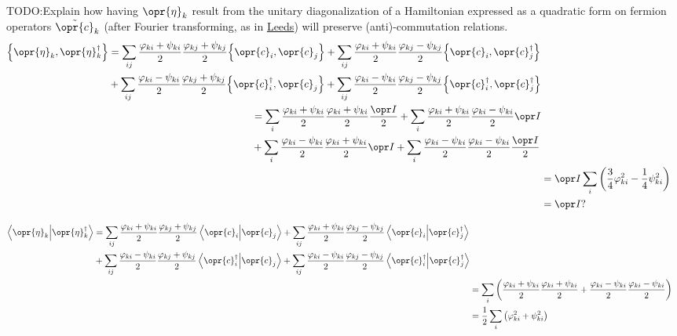 \documentclass[../thesis.tex]{subfiles}
\begin{document}
TODO:\@ Explain how having $\opr{\eta}_k$ result from the unitary
diagonalization of a Hamiltonian expressed as a quadratic form on fermion
operators $\tilde{\opr{c}}_k$ (after Fourier transforming, as in
\href{https://theory.leeds.ac.uk/interaction-distance/applications/ising/map-to-free/}{Leeds})
will preserve (anti)-commutation relations.
\begin{align}
  \begin{split}
    \acomm{\opr{\eta}_k}{\opr{\eta}_k^\dag}
  &=
  \sum_{ij}
  \frac{\varphi_{ki} + \psi_{ki}}{2}
  \frac{\varphi_{kj} + \psi_{kj}}{2}
  \acomm{\opr{c}_i}{\opr{c}_j}
  +
  \sum_{ij}
  \frac{\varphi_{ki} + \psi_{ki}}{2}
  \frac{\varphi_{kj} - \psi_{kj}}{2}
  \acomm{\opr{c}_i}{\opr{c}_j^\dag} \\
  &+
  \sum_{ij}
  \frac{\varphi_{ki} - \psi_{ki}}{2}
  \frac{\varphi_{kj} + \psi_{kj}}{2}
  \acomm{\opr{c}_i^\dag}{\opr{c}_j}
  +
  \sum_{ij}
  \frac{\varphi_{ki} - \psi_{ki}}{2}
  \frac{\varphi_{kj} - \psi_{kj}}{2}
  \acomm{\opr{c}_i^\dag}{\opr{c}_j^\dag}
  \end{split} \\
  \begin{split}
  &=
  \sum_{i}
  \frac{\varphi_{ki} + \psi_{ki}}{2}
  \frac{\varphi_{ki} + \psi_{ki}}{2}
  \frac{\idopr}{2}
  +
  \sum_{i}
  \frac{\varphi_{ki} + \psi_{ki}}{2}
  \frac{\varphi_{ki} - \psi_{ki}}{2}
  \idopr \\
  &+
  \sum_{i}
  \frac{\varphi_{ki} - \psi_{ki}}{2}
  \frac{\varphi_{ki} + \psi_{ki}}{2}
  \idopr
  +
  \sum_{i}
  \frac{\varphi_{ki} - \psi_{ki}}{2}
  \frac{\varphi_{ki} - \psi_{ki}}{2}
  \frac{\idopr}{2}
  \end{split} \\
  &= \idopr\sum_i \qty(\frac{3}{4}\varphi_{ki}^2 - \frac{1}{4}\psi_{ki}^2) \\
  &= \idopr?
\end{align}

\begin{align}
  \begin{split}
    \ip{\opr{\eta}_k}{\opr{\eta}_k^\dag}
  &=
  \sum_{ij}
  \frac{\varphi_{ki} + \psi_{ki}}{2}
  \frac{\varphi_{kj} + \psi_{kj}}{2}
  \ip{\opr{c}_i}{\opr{c}_j}
  +
  \sum_{ij}
  \frac{\varphi_{ki} + \psi_{ki}}{2}
  \frac{\varphi_{kj} - \psi_{kj}}{2}
  \ip{\opr{c}_i}{\opr{c}_j^\dag} \\
  &+
  \sum_{ij}
  \frac{\varphi_{ki} - \psi_{ki}}{2}
  \frac{\varphi_{kj} + \psi_{kj}}{2}
  \ip{\opr{c}_i^\dag}{\opr{c}_j}
  +
  \sum_{ij}
  \frac{\varphi_{ki} - \psi_{ki}}{2}
  \frac{\varphi_{kj} - \psi_{kj}}{2}
  \ip{\opr{c}_i^\dag}{\opr{c}_j^\dag}
  \end{split} \\
  &=
  \sum_i \qty(%
  \frac{\varphi_{ki} + \psi_{ki}}{2}
  \frac{\varphi_{ki} + \psi_{ki}}{2}
  +
  \frac{\varphi_{ki} - \psi_{ki}}{2}
  \frac{\varphi_{ki} - \psi_{ki}}{2}
  ) \\
  &=
  \frac{1}{2}
  \sum_i \qty(%
  \varphi_{ki}^2 + \psi_{ki}^2
  )
\end{align}
\end{document}
